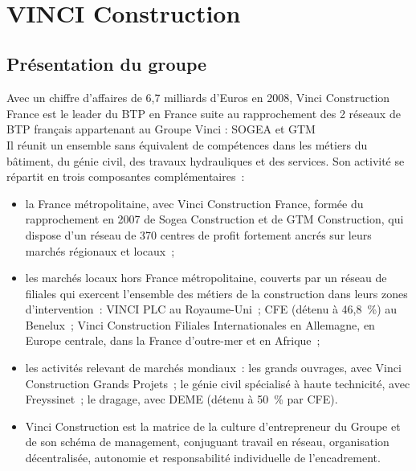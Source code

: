 \documentclass[a4paper]{article}
\begin{document}
\maketitle

\hfill\\
\section {VINCI Construction}

\subsection{Présentation du groupe}

Avec un chiffre d’affaires de 6,7 milliards d’Euros en 2008, Vinci Construction France est le leader du BTP en France suite au rapprochement des 2 réseaux de BTP français appartenant au Groupe Vinci : SOGEA et GTM \\

Il réunit un ensemble sans équivalent de compétences dans les métiers du bâtiment, du génie civil, des travaux hydrauliques et des services.
Son activité se répartit en trois composantes complémentaires : \\

\begin{itemize}
\item la France métropolitaine, avec Vinci Construction France, formée du rapprochement en 2007 de Sogea Construction et de GTM Construction, qui dispose d’un réseau de 370 centres de profit fortement ancrés sur leurs marchés régionaux et locaux ;
\item les marchés locaux hors France métropolitaine, couverts par un réseau de filiales qui exercent l’ensemble des métiers de la construction dans leurs zones d’intervention : VINCI PLC au Royaume-Uni ; CFE (détenu à 46,8 \%) au Benelux ; Vinci Construction Filiales Internationales en Allemagne, en Europe centrale, dans la France d’outre-mer et en Afrique ;
\item les activités relevant de marchés mondiaux : les grands ouvrages, avec Vinci Construction Grands Projets ; le génie civil spécialisé à haute technicité, avec Freyssinet ; le dragage, avec DEME (détenu à 50 \% par CFE).
\item Vinci Construction est la matrice de la culture d’entrepreneur du Groupe et de son schéma de management, conjuguant travail en réseau, organisation décentralisée, autonomie et responsabilité individuelle de l’encadrement.
\end{itemize}
\end{document}
